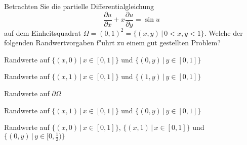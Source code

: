Betrachten Sie die partielle Differentialgleichung
\[
\frac{\partial u}{\partial x}
+x
\frac{\partial u}{\partial y}
=
\sin u
\]
auf dem Einheitsquadrat $\Omega=(0,1)^2=\{(x,y)\,|\, 0<x,y<1\}$.
Welche der folgenden Randwertvorgaben f"uhrt zu einem gut gestellten
Problem?
\begin{teilaufgaben}
\item
Randwerte auf $\{(x,0)\,|\,x\in [0,1]\}$ und $\{(0,y)\,|\,y\in[0,1]\}$
\item
Randwerte auf $\{(x,1)\,|\,x\in [0,1]\}$ und $\{(1,y)\,|\,y\in[0,1]\}$
\item
Randwerte auf $\partial\Omega$
\item
Randwerte auf $\{(x,1)\,|\,x\in [0,1]\}$ und $\{(0,y)\,|\,y\in[0,1]\}$
\item
Randwerte auf
$\{(x,0)\,|\,x\in [0,1]\}$,
$\{(x,1)\,|\,x\in [0,1]\}$ und 
$\{(0,y)\,|\,y\in[0,\frac12)\}$
\end{teilaufgaben}

